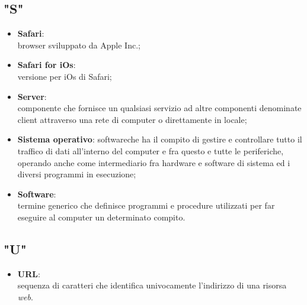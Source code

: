 \subsection*{"S"}
\begin{itemize}
\item \textbf{Safari}:\\ browser sviluppato da Apple Inc.;
\item \textbf{Safari for iOs}:\\ versione per iOs di Safari;
\item \textbf{Server}:\\ componente che fornisce un qualsiasi servizio ad altre componenti denominate client attraverso una rete di computer o direttamente in locale;
\item \textbf{Sistema operativo}: software\ped che ha il compito di gestire e controllare tutto il traffico di dati all’interno del computer e fra questo e tutte le periferiche, operando anche come intermediario fra hardware e software di sistema ed i diversi programmi in esecuzione;
\item \textbf{Software}:\\ termine generico che definisce programmi e procedure utilizzati per far eseguire al computer un determinato compito.
\end{itemize} 

\subsection*{"U"}
\begin{itemize}
\item \textbf{URL}:\\ sequenza di caratteri che identifica univocamente l'indirizzo di una risorsa \textit{web}.
\end{itemize}